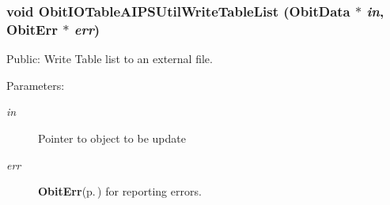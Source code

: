 \subsubsection{\setlength{\rightskip}{0pt plus 5cm}void Obit\-IOTable\-AIPSUtil\-Write\-Table\-List ({\bf Obit\-Data} $\ast$ {\em in}, {\bf Obit\-Err} $\ast$ {\em err})}\label{ObitIOTableAIPSUtil_8h_a1}


Public: Write Table list to an external file. 

\begin{Desc}
\item[Parameters:]
\begin{description}
\item[{\em in}]Pointer to object to be update \item[{\em err}]{\bf Obit\-Err}{\rm (p.\,\pageref{structObitErr})} for reporting errors. \end{description}
\end{Desc}
